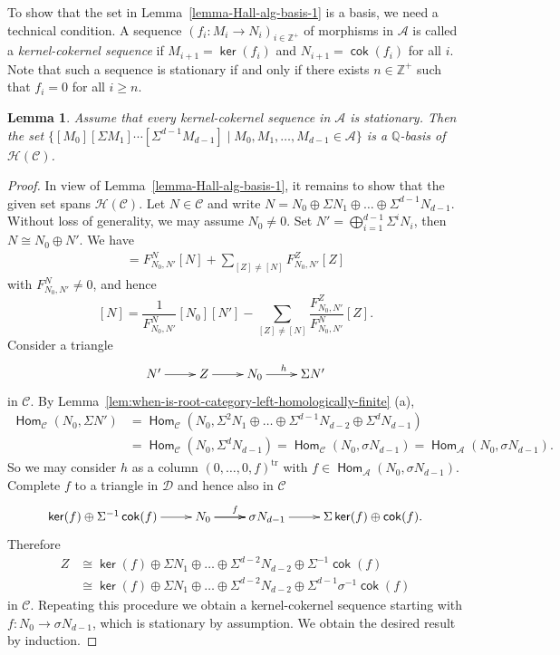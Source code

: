 \documentclass[reqno,12pt,a4paper]{amsart}
\newtheorem{lemma}[theorem]{Lemma}
\theoremstyle{remark}
\theoremstyle{definition}
\newcommand{\opname}[1]{\operatorname{\mathsf{#1}}}
\newcommand{\cok}{\opname{cok}\nolimits}
\renewcommand{\ker}{\opname{ker}\nolimits}
\newcommand{\Hom}{\opname{Hom}}
\newcommand{\ca}{{\mathcal A}}
\newcommand{\cc}{{\mathcal C}}
\newcommand{\cd}{{\mathcal D}}
\newcommand{\ch}{{\mathcal H}}
\numberwithin{equation}{section}
\begin{document}
To show that the set in Lemma~\ref{lemma-Hall-alg-basis-1} is a basis, we need a technical condition. A sequence $(f_i\colon M_i\to N_i)_{i\in\mathbb{Z}^+}$ of morphisms in $\ca$ is called a \emph{kernel-cokernel sequence} if $M_{i+1}=\ker(f_i)$ and $N_{i+1}=\cok(f_i)$ for all $i$. Note that such a sequence is stationary if and only if there exists $n\in\mathbb{Z}^+$ such that $f_i=0$ for all $i\geq n$.

\begin{lemma}\label{lemma-Hall-alg-basis-2} Assume that every kernel-cokernel sequence in $\ca$ is stationary. Then
the set $\{[M_0][\Sigma M_1] \cdots [\Sigma^{d-1} M_{d-1}]\mid M_0,M_1,\ldots,M_{d-1}\in\ca\}$ is a $\mathbb{Q}$-basis of $\ch(\cc)$.
\end{lemma}
\begin{proof} In view of Lemma~\ref{lemma-Hall-alg-basis-1}, it remains to show that the given set spans $\ch(\cc)$.
Let $N\in \mathcal{C}$ and write $N=N_0\oplus \Sigma N_1\oplus\ldots\oplus \Sigma^{d-1}N_{d-1}$. Without loss of generality, we may assume $N_0\neq 0$. Set $N'=\bigoplus\limits_{i=1}^{d-1} \Sigma^i N_i$, then $N\cong N_0\oplus N'$. We have
\begin{align*}
  [N_0][N']=F_{N_0,N'}^{N}[N]+\sum_{[Z]\neq [N]} F_{N_0,N'}^{Z}[Z]
\end{align*}
with $F_{N_0,N'}^{N}\neq 0$, and hence
\[
[N]=\frac{1}{F_{N_0,N'}^{N}}[N_0][N']-\sum_{[Z]\neq [N]} \frac{F_{N_0,N'}^{Z}}{F_{N_0,N'}^{N}}[Z].
\]
Consider a triangle
\[
\xymatrix{
N'\ar[r] & Z\ar[r] & N_0\ar[r]^h & \Sigma N'
}
\]
in $\mathcal{C}$. By Lemma~\ref{lem:when-is-root-category-left-homologically-finite} (a),
\begin{align*}
\Hom_\cc(N_0,\Sigma N')&=\Hom_\cc(N_0,\Sigma^2N_1\oplus\ldots\oplus \Sigma^{d-1}N_{d-2}\oplus \Sigma^d N_{d-1})\\
&=\Hom_\cc(N_0,\Sigma^d N_{d-1})=\Hom_\cc(N_0,\sigma N_{d-1})=\Hom_\ca(N_0,\sigma N_{d-1}).
\end{align*}
So we may consider $h$ as a column $(0,\ldots,0,f)^{\mathrm{tr}}$ with $f\in\Hom_\ca(N_0,\sigma N_{d-1})$. Complete $f$ to a triangle in $\cd$ and hence also in $\cc$
\[
\xymatrix{
\ker(f)\oplus\Sigma^{-1}\cok(f)\ar[r] & N_0\ar[r]^f\ar[r] &\sigma N_{d-1}\ar[r] & \Sigma\ker(f)\oplus \cok(f).
}
\]
Therefore
\begin{align*}
Z&\cong\ker(f)\oplus\Sigma N_1\oplus\ldots\oplus \Sigma^{d-2}N_{d-2}\oplus \Sigma^{-1}\cok(f)\\
&\cong\ker(f)\oplus\Sigma N_1\oplus\ldots\oplus \Sigma^{d-2}N_{d-2}\oplus \Sigma^{d-1}\sigma^{-1}\cok(f)
\end{align*}
 in $\cc$.
Repeating this procedure we obtain a kernel-cokernel sequence starting with $f\colon N_0\to \sigma N_{d-1}$, which is stationary by assumption. We obtain the desired result by induction.
\end{proof}
\end{document}
